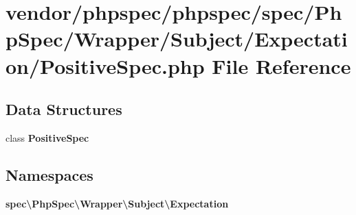 \section{vendor/phpspec/phpspec/spec/\+Php\+Spec/\+Wrapper/\+Subject/\+Expectation/\+Positive\+Spec.php File Reference}
\label{_positive_spec_8php}
\subsection*{Data Structures}
\begin{DoxyCompactItemize}
\item 
class {\bf Positive\+Spec}
\end{DoxyCompactItemize}
\subsection*{Namespaces}
\begin{DoxyCompactItemize}
\item 
 {\bf spec\textbackslash{}\+Php\+Spec\textbackslash{}\+Wrapper\textbackslash{}\+Subject\textbackslash{}\+Expectation}
\end{DoxyCompactItemize}
